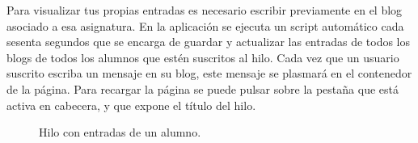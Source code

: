 \documentclass[a4paper, 12pt]{book}
\begin{document}
Para visualizar tus propias entradas es necesario escribir previamente en el blog asociado a esa asignatura. En la aplicaci\'on se ejecuta un script 
autom\'atico cada sesenta segundos que se encarga de guardar y actualizar las entradas de todos los blogs de todos los alumnos que est\'en suscritos al 
hilo. Cada vez que un usuario suscrito escriba un mensaje en su blog, este mensaje se plasmar\'a en el contenedor de la p\'agina. Para recargar la p\'agina 
se puede pulsar sobre la pesta\~na que est\'a activa en cabecera, y que expone el t\'itulo del hilo.
\begin{figure}[htbp] 
  \centering
  \caption{Hilo con entradas de un alumno.}
  \label{figura:hiloalumno1}
\end{figure}
\end{document}
